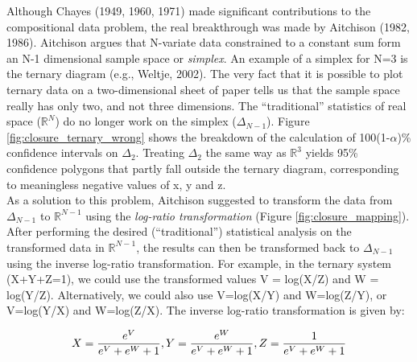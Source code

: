 \documentclass{article}
\begin{document}
Although Chayes  (1949, 1960, 1971) made  significant contributions to
the  compositional data  problem, the  real breakthrough  was  made by
Aitchison  (1982,   1986).   Aitchison  argues   that  N-variate  data
constrained to a constant sum  form an N-1 dimensional sample space or
{\it simplex}. An example of a  simplex for N=3 is the ternary diagram
(e.g.,  Weltje, 2002).   The very  fact that  it is  possible  to plot
ternary data  on a  two-dimensional sheet of  paper tells us  that the
sample  space really  has only  two,  and not  three dimensions.   The
``traditional'' statistics of real space ($\mathbb{R}^N$) do no longer
work      on      the      simplex      ($\Delta_{N-1}$).       Figure
\ref{fig:closure_ternary_wrong} shows the breakdown of the calculation
of 100(1-$\alpha$)\%  confidence intervals on  $\Delta_{2}$.  Treating
$\Delta_{2}$  the same  way as  $\mathbb{R}^3$ yields  95\% confidence
polygons that  partly fall outside the  ternary diagram, corresponding
to meaningless negative values of x, y and z.\\

As a  solution to this  problem, Aitchison suggested to  transform the
data  from   $\Delta_{N-1}$  to  $\mathbb{R}^{N-1}$   using  the  {\it
log-ratio  transformation} (Figure  \ref{fig:closure_mapping}).  After
performing the  desired (``traditional'') statistical  analysis on the
transformed  data  in  $\mathbb{R}^{N-1}$,  the results  can  then  be
transformed  back  to   $\Delta_{N-1}$  using  the  inverse  log-ratio
transformation. For example, in the ternary system (X+Y+Z=1), we could
use  the   transformed  values  V   =  log(X/Z)  and  W   =  log(Y/Z).
Alternatively,  we  could  also  use  V=log(X/Y)  and  W=log(Z/Y),  or
V=log(Y/X)  and W=log(Z/X).  The  inverse log-ratio  transformation is
given by:

\begin{equation}
  \label{eq:inverse_transform}
  X  =  \frac{e^V}{e^V+e^W+1},~\\
  Y  =  \frac{e^W}{e^V+e^W+1},~\\
  Z  =  \frac{1}{e^V+e^W+1}
\end{equation}
\end{document}
